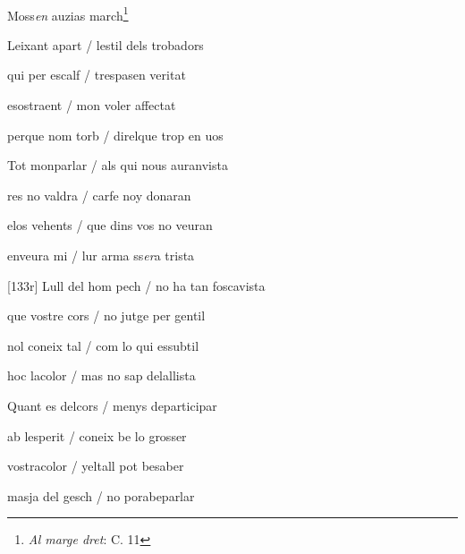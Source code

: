 \documentclass[12pt]{article}
\renewcommand{\espaiAbansEtiquetaPoema}{\vspace{0ex}}
\begin{document}
\begin{estrofa}

\espaiAbansEtiquetaPoema

\\

\begin{rubrica}

Moss\textit{en} auzias march\footnote{\textit{Al marge dret}: C. 11}

\end{rubrica}

\end{estrofa}


\begin{estrofa}

 Leixant apart / lestil dels trobadors

 qui per escalf / trespasen veritat

 esostraent / mon voler affectat

 perque nom torb / direlque trop en uos

 Tot monparlar / als qui nous auranvista

 res no valdra / carfe noy donaran

 elos vehents / que dins vos no veuran

 enveura mi / lur arma ss\textit{er}a trista

\end{estrofa}



\begin{estrofa}

 [133r] Lull del hom pech / no ha tan foscavista

 que vostre cors / no jutge per gentil

 nol coneix tal / com lo qui essubtil

 hoc lacolor / mas no sap delallista

 Quant es delcors / menys departicipar

 ab lesperit / coneix be lo grosser

 vostracolor / yeltall pot besaber

 masja del gesch / no porabeparlar

\end{estrofa}
\end{document}
